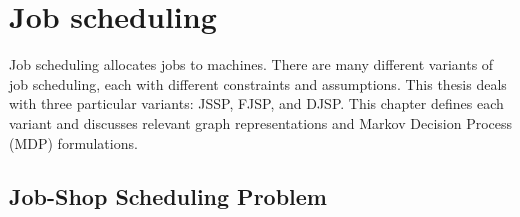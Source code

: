 \chapter{Job scheduling}
\label{chap:refs}

Job scheduling allocates jobs to machines. There are many different variants of job scheduling, each with different constraints and assumptions. This thesis deals with three particular variants: JSSP, FJSP, and DJSP. This chapter defines each variant and discusses relevant graph representations and Markov Decision Process (MDP) formulations.

\section{Job-Shop Scheduling Problem}

